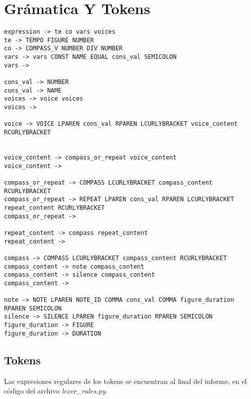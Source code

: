 \section{Grámatica Y Tokens}

\begin{verbatim}
expression -> te co vars voices
te -> TEMPO FIGURE NUMBER
co -> COMPASS_V NUMBER DIV NUMBER
vars -> vars CONST NAME EQUAL cons_val SEMICOLON
vars ->

cons_val -> NUMBER
cons_val -> NAME
voices -> voice voices
voices ->

voice -> VOICE LPAREN cons_val RPAREN LCURLYBRACKET voice_content RCURLYBRACKET


voice_content -> compass_or_repeat voice_content
voice_content ->

compass_or_repeat -> COMPASS LCURLYBRACKET compass_content RCURLYBRACKET
compass_or_repeat -> REPEAT LPAREN cons_val RPAREN LCURLYBRACKET repeat_content RCURLYBRACKET
compass_or_repeat ->

repeat_content -> compass repeat_content 
repeat_content ->

compass -> COMPASS LCURLYBRACKET compass_content RCURLYBRACKET
compass_content -> note compass_content 
compass_content -> silence compass_content
compass_content ->

note -> NOTE LPAREN NOTE_ID COMMA cons_val COMMA figure_duration RPAREN SEMICOLON
silence -> SILENCE LPAREN figure_duration RPAREN SEMICOLON
figure_duration -> FIGURE
figure_duration -> DURATION

\end{verbatim}

\subsection{Tokens}

Las expresiones regulares de los tokens se encuentran al final del informe, en el código del archivo \textit{lexer\_rules.py}.